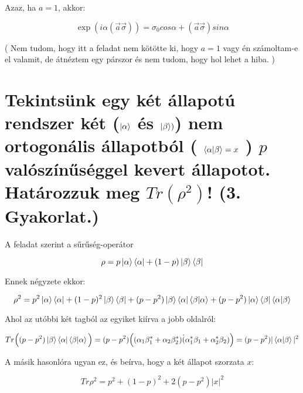 \documentclass[a4paper,12pt]{article}
\begin{document}
\par Azaz, ha $a = 1$, akkor:

\begin{equation}
\exp(i\alpha(\vec{a}\vec{\sigma})) = \sigma_0 cos\alpha + (\vec{a}\vec{\sigma}) sin\alpha
\end{equation}

\par ( Nem tudom, hogy itt a feladat nem kötötte ki, hogy $a = 1$ vagy én számoltam-e el valamit, de átnéztem egy párszor és nem tudom, hogy hol lehet a hiba. )

\section{Tekintsünk egy két állapotú rendszer két ($\ket{\alpha}$ és $\ket{\beta})$) nem ortogonális állapotból ( $\bra{\alpha}\ket{\beta} = x$ ) $p$ valószínűséggel kevert állapotot. Határozzuk meg $Tr(\rho^{2})$! (3. Gyakorlat.)}

\par A feladat szerint a sűrűség-operátor

\begin{equation*}
\rho = p\ket{\alpha}\bra{\alpha} + (1-p)\ket{\beta}\bra{\beta}
\end{equation*}

\par Ennek négyzete ekkor:

\begin{equation*}
\rho^{2} = p^{2}\ket{\alpha}\bra{\alpha} + (1-p)^{2}\ket{\beta}\bra{\beta} + (p - p^{2})\ket{\beta}\bra{\alpha}\bra{\beta}\ket{\alpha} + (p - p^{2})\ket{\alpha}\bra{\beta}\bra{\alpha}\ket{\beta}
\end{equation*}

\par Ahol az utóbbi két tagból az egyiket kiírva a jobb oldalról:

\begin{equation*}
Tr\Big((p - p^{2})\ket{\beta}\bra{\alpha}\bra{\beta}\ket{\alpha}\Big) = (p - p^{2})\Big( (\alpha_1 \beta_1^{*} + \alpha_2 \beta_{2}^{*})\dot(\alpha_{1}^{*}\beta_1 + \alpha_{2}^{*}\beta_{2})\Big) = (p - p^{2})|\bra{\alpha}\ket{\beta}|^{2}
\end{equation*}

\par A másik hasonlóra ugyan ez, és beírva, hogy a két állapot szorzata $x$:

\begin{equation*}
Tr\rho^{2} = p^{2}+ (1-p)^{2} + 2(p - p^{2})|x|^{2}
\end{equation*}
\end{document}
